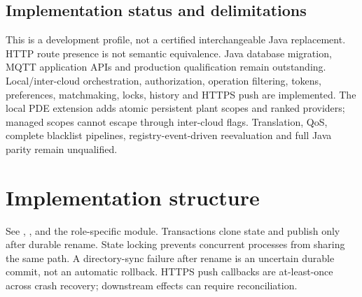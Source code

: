 \documentclass[a4paper]{arrowhead}
\begin{document}
\subsection{Implementation status and delimitations}
This is a development profile, not a certified interchangeable Java replacement. HTTP route presence is not semantic equivalence. Java database migration, MQTT application APIs and production qualification remain outstanding.
Local/inter-cloud orchestration, authorization, operation filtering, tokens, preferences, matchmaking, locks, history and HTTPS push are implemented. The local PDE extension adds atomic persistent plant scopes and ranked providers; managed scopes cannot escape through inter-cloud flags. Translation, QoS, complete blacklist pipelines, registry-event-driven reevaluation and full Java parity remain unqualified.
\section{Implementation structure}
See , ,  and the role-specific module. Transactions clone state and publish only after durable rename. State locking prevents concurrent processes from sharing the same path. A directory-sync failure after rename is an uncertain durable commit, not an automatic rollback. HTTPS push callbacks are at-least-once across crash recovery; downstream effects can require reconciliation.
\end{document}
